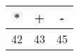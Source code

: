 \begin{center}
\begin{tabular}{|c|c|c|}
\hline
* & + & - \\
\hline
42 & 43 & 45 \\
\hline
\end{tabular}
\end{center}